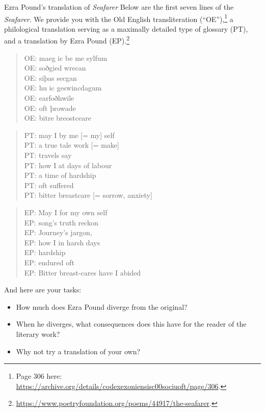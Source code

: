 \begin{exercises}{Ezra Pound's translation of \textit{Seafarer}}
\chili{}
Below are the first seven lines of the \textit{Seafarer}. We provide you with the Old English transliteration (``OE''),\footnote{Page 306 here: \url{https://archive.org/details/codexexoniensisc00sociuoft/page/306}.} a philological translation serving as a maximally detailed type of glossary (PT), and a translation by Ezra Pound (EP).\footnote{\url{https://www.poetryfoundation.org/poems/44917/the-seafarer}.}

\begin{quote}
OE: maeg ic be me sylfum\\
OE: soðgied wrecan\\
OE: siþas secgan\\
OE: hu ic geswincdagum\\
OE: earfoðhwile\\
OE: oft þrowade\\
OE: bitre breostceare
\end{quote}

\begin{quote}
PT: may I by me [= my] self\\
PT: a true tale work [= make]\\
PT: travels say\\
PT: how I at days of labour\\
PT: a time of hardship\\
PT: oft suffered\\
PT: bitter breastcare [= sorrow, anxiety]
\end{quote}

\begin{quote}
EP: May I for my own self\\
EP: song's truth reckon\\
EP: Journey's jargon,\\
EP: how I in harsh days\\
EP: hardship\\
EP: endured oft\\
EP: Bitter breast-cares have I abided
\end{quote}

\noindent And here are your tasks:
\begin{itemize}
\item How much does Ezra Pound diverge from the original?
\item When he diverges, what consequences does this have for the reader of the literary work?
\item Why not try a translation of your own?
\end{itemize}

\end{exercises}

